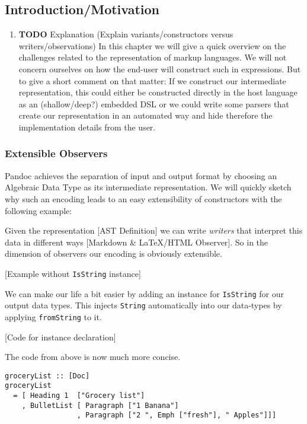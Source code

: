 \documentclass[11pt]{article}
\begin{document}
\subsection{Introduction/Motivation}
\label{sec:org1af19bf}
\begin{enumerate}
\item {\bfseries\sffamily TODO} Explanation
\label{sec:org22f858b}
(Explain variants/constructors versus writers/observations)
In this chapter we will give a quick overview on the challenges related to the
representation of markup languages. We will not concern ourselves on how the
end-user will construct such in expressions. But to give a short comment on that
matter: If we construct our intermediate representation, this could either be
constructed directly in the host language as an (shallow/deep?) embedded DSL or
we could write some parsers that create our representation in an automated way
and hide therefore the implementation details from the user.
\end{enumerate}


\subsubsection{Extensible Observers}
\label{sec:org3723f99}

Pandoc achieves the separation of input and output format by choosing an
Algebraic Data Type as its intermediate representation.
We will quickly sketch why such an encoding leads to an easy extensibility of
constructors with the following example:

Given the representation [AST Definition] we can write \emph{writers} that interpret
this data in different ways [Markdown \& \LaTeX{}/HTML Observer]. So in the dimension of
observers our encoding is obviously extensible.

[Example without \texttt{IsString} instance]

We can make our life a bit easier by adding an instance for \texttt{IsString} for our
output data types. This injects \texttt{String} automatically into our data-types by
applying \texttt{fromString} to it.

[Code for instance declaration]

The code from above is now much more concise.

\begin{verbatim}
groceryList :: [Doc]
groceryList
  = [ Heading 1  ["Grocery list"]
    , BulletList [ Paragraph ["1 Banana"]
                 , Paragraph ["2 ", Emph ["fresh"], " Apples"]]]
\end{verbatim}
\end{document}
